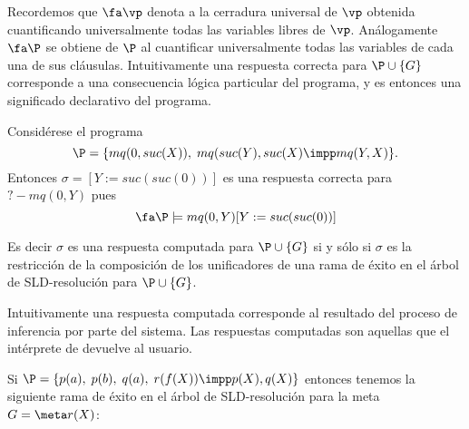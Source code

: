 \documentclass[11pt,letterpaper]{article}
\begin{document}
Recordemos que $\fa\vp$ denota a la cerradura universal de $\vp$ obtenida 
cuantificando universalmente todas las variables libres de $\vp$. 
An\'alogamente $\fa\P$ se obtiene de  $\P$ al cuantificar universalmente todas 
las variables de cada una de sus cl\'ausulas. Intuitivamente una respuesta
correcta para $\P\cup\{G\}$ corresponde a una consecuencia l\'ogica
particular del programa, y es entonces una significado declarativo del
programa. 

\beje Consid\'erese el programa
\[
\P=\{mq(0,suc(X)),\;mq(suc(Y),suc(X)\impp
mq(Y,X)\}.
\] 
Entonces $\sigma=[Y:=suc(suc(0))]$ es una respuesta
correcta para $?-mq(0,Y)$ pues 
\[
\fa\P\models mq(0,Y)[Y:=suc(suc(0))]
\]
\eeje


Es decir $\sigma$ es una respuesta computada para $\P\cup\{G\}$ si y
s\'olo si $\sigma$ es la restricci\'on de la composici\'on de los unificadores 
de una rama de \'exito en el \'arbol de SLD-resoluci\'on para $\P\cup\{G\}$.

Intuitivamente una respuesta computada corresponde al resultado del proceso de 
inferencia por parte del sistema. Las respuestas computadas son aquellas que el 
int\'erprete de {\pl} devuelve al usuario. 

\beje
Si $\P=\{p(a),\;p(b),\;q(a),\;r(f(X))\impp p(X),q(X)\}$ entonces
tenemos la siguiente rama de \'exito en el \'arbol de SLD-resoluci\'on para la 
meta $G=\meta r(X)$:
\end{document}
